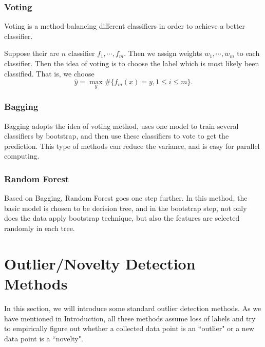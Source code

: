 \documentclass[english]{article}
\begin{document}
\subsubsection{Voting}
\par Voting is a method balancing different classifiers in order to achieve a better classifier.
\par Suppose their are $n$ classifier $f_{1}, \cdots, f_{m}$. Then we assign weights $w_{1}, \cdots, w_{m}$ to each classifier. Then the idea of voting is to choose the label which is most likely been classified. That is, we choose 
\begin{equation}
	\hat{y} = \max_{y}\#\{f_{m}(x) = y, 1\le i\le m\}.
\end{equation}

\subsubsection{Bagging}
\par Bagging adopts the idea of voting method, uses one model to train several classifiers by bootstrap, and then use these classifiers to vote to get the prediction. This type of methods can reduce the variance, and is easy for parallel computing.

\subsubsection{Random Forest}
\par Based on Bagging, Random Forest goes one step further. In this method, the basic model is chosen to be decision tree, and in the bootstrap step, not only does the data apply bootstrap technique, but also the features are selected randomly in each tree.

\section{Outlier/Novelty Detection Methods}

\par
In this section, we will introduce some standard outlier detection methods. As we have mentioned in Introduction, all these methods assume loss of labels and try to empirically figure out whether a collected data point is an ``outlier" or a new data point is a ``novelty". 
\end{document}
